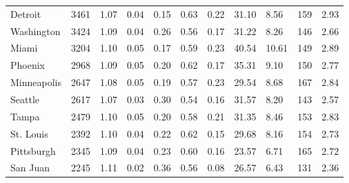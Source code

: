 \documentclass[11pt]{article}
\begin{document}
\begin{table}
\begin{tabular}{p{2.5cm} p{1.5cm} p{1.5cm} p{1.5cm} p{1.55cm} p{1.5cm} p{1.5cm} p{1.5cm} p{1.5cm} p{1.5cm} p{1.5cm}}
	Detroit              & 3461          & 1.07         & 0.04                       & 0.15           & 0.63        & 0.22        & 31.10                 & 8.56                  & 159                   & 2.93             \\
	Washington           & 3424          & 1.09         & 0.04                       & 0.26           & 0.56        & 0.17        & 31.22                 & 8.26                  & 146                   & 2.66             \\
	Miami                & 3204          & 1.10         & 0.05                       & 0.17           & 0.59        & 0.23        & 40.54                 & 10.61                 & 149                   & 2.89             \\
	Phoenix              & 2968          & 1.09         & 0.05                       & 0.20           & 0.62        & 0.17        & 35.31                 & 9.10                  & 150                   & 2.77             \\
	Minneapolis          & 2647          & 1.08         & 0.05                       & 0.19           & 0.57        & 0.23        & 29.54                 & 8.68                  & 167                   & 2.84             \\
	Seattle              & 2617          & 1.07         & 0.03                       & 0.30           & 0.54        & 0.16        & 31.57                 & 8.20                  & 143                   & 2.57             \\
	Tampa                & 2479          & 1.10         & 0.05                       & 0.20           & 0.58        & 0.21        & 31.35                 & 8.46                  & 153                   & 2.83             \\
	St. Louis            & 2392          & 1.10         & 0.04                       & 0.22           & 0.62        & 0.15        & 29.68                 & 8.16                  & 154                   & 2.73             \\
	Pittsburgh           & 2345          & 1.09         & 0.04                       & 0.23           & 0.60        & 0.16        & 23.57                 & 6.71                  & 165                   & 2.72             \\
	San Juan             & 2245          & 1.11         & 0.02                       & 0.36           & 0.56        & 0.08        & 26.57                 & 6.43                  & 131                   & 2.36             \\

\end{tabular}
\end{table}
\end{document}
